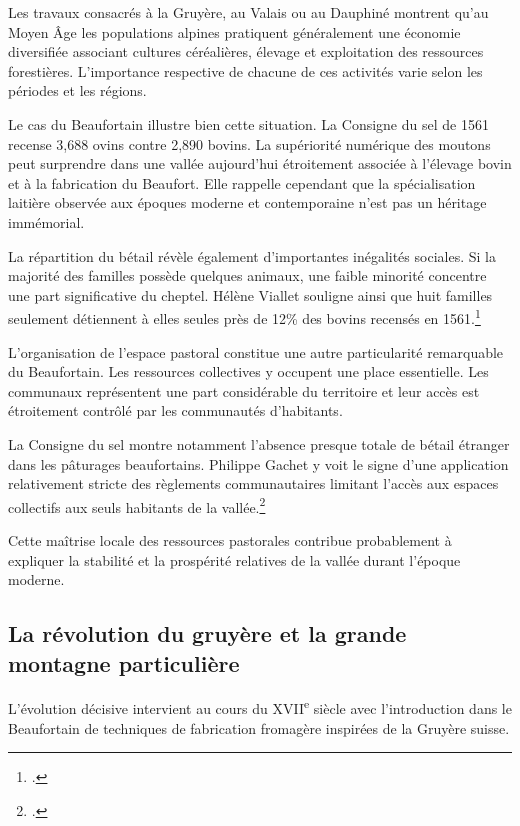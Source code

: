 \documentclass[12pt,a4paper]{report}
\begin{document}
Les travaux consacrés à la Gruyère, au Valais ou au Dauphiné montrent qu'au Moyen Âge les populations alpines pratiquent généralement une économie diversifiée associant cultures céréalières, élevage et exploitation des ressources forestières. L'importance respective de chacune de ces activités varie selon les périodes et les régions.

Le cas du Beaufortain illustre bien cette situation. La Consigne du sel de 1561 recense 3,688 ovins contre 2,890 bovins. La supériorité numérique des moutons peut surprendre dans une vallée aujourd'hui étroitement associée à l'élevage bovin et à la fabrication du Beaufort. Elle rappelle cependant que la spécialisation laitière observée aux époques moderne et contemporaine n'est pas un héritage immémorial.

La répartition du bétail révèle également d'importantes inégalités sociales. Si la majorité des familles possède quelques animaux, une faible minorité concentre une part significative du cheptel. Hélène Viallet souligne ainsi que huit familles seulement détiennent à elles seules près de 12\% des bovins recensés en 1561.\footcite[90--92]{HViallet1993}

L'organisation de l'espace pastoral constitue une autre particularité remarquable du Beaufortain. Les ressources collectives y occupent une place essentielle. Les communaux représentent une part considérable du territoire et leur accès est étroitement contrôlé par les communautés d'habitants.

La Consigne du sel montre notamment l'absence presque totale de bétail étranger dans les pâturages beaufortains. Philippe Gachet y voit le signe d'une application relativement stricte des règlements communautaires limitant l'accès aux espaces collectifs aux seuls habitants de la vallée.\footcite[88]{Gachet2011GabelleSel1561}

Cette maîtrise locale des ressources pastorales contribue probablement à expliquer la stabilité et la prospérité relatives de la vallée durant l'époque moderne.

\subsection{La révolution du gruyère et la grande montagne particulière}

L'évolution décisive intervient au cours du XVII\textsuperscript{e} siècle avec l'introduction dans le Beaufortain de techniques de fabrication fromagère inspirées de la Gruyère suisse.
\end{document}
